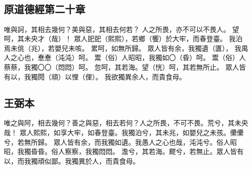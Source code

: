 ﻿%
%

\chapter{~}

\section{原道德經第二十章}

\begin{withgezhu}

\zhsong


唯與訶，其相去幾何？美與惡，其相去何若？
人之\colorbox{adding-color}{所畏}，亦不\colorbox{adding-color}{可以不畏人}。
\colorbox{adding-color}{望呵，其未央才（\textcolor{tongjia-color}{哉}）}！
眾人巸巸（\textcolor{tongjia-color}{熙熙}），若鄉（\textcolor{tongjia-color}{饗}）於大牢，而春登臺。
我泊焉未佻（\textcolor{tongjia-color}{兆}），若\colorbox{adding-color}{嬰兒未咳}。
累呵，如\colorbox{adding-color}{無所歸}。
\colorbox{adding-color}{眾人}皆有余，我獨遺（\textcolor{tongjia-color}{匱}），
我禺人之心也，惷惷（\textcolor{tongjia-color}{沌沌}）呵。
鬻（\textcolor{tongjia-color}{俗}）\colorbox{adding-color}{人昭昭，我獨如}〇（\textcolor{tongjia-color}{昏}）呵。
鬻（\textcolor{tongjia-color}{俗}）人蔡蔡，我獨〇〇（\textcolor{tongjia-color}{悶悶}）呵。
忽呵，其若\colorbox{adding-color}{海}。望（\textcolor{tongjia-color}{恍}）呵，其若無所止。
\colorbox{adding-color}{眾人皆有以，我獨䦎（\textcolor{tongjia-color}{頑}）}以悝（\textcolor{tongjia-color}{俚}）。
我欲獨異余人，而貴食母。

\end{withgezhu}

\section{王弼本}

\begin{withgezhu}

\zhsong

唯之與阿，相去幾何？善之與惡，相去若何？人之所畏，不可不畏。荒兮，其未央哉！
眾人熙熙，如享大牢，如春登臺。我獨泊兮，其未兆，如嬰兒之未孩。儽儽兮，若無所歸。
眾人皆有余，而我獨如遺。我愚人之心也哉，沌沌兮。俗人昭昭，我獨昏昏。俗人察察，我獨悶悶。
澹兮，其若海。飂兮，若無止。眾人皆有以，而我獨頑似鄙。我獨異於人，而貴食母。

\end{withgezhu}
